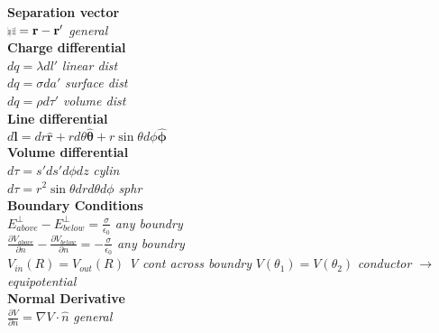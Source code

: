 \documentclass{article}
\def\brcurs{{\mbox{$\resizebox{.09in}{.08in}{\texttt{[image: BoldR]}}$}}}
\begin{document}
\pagebreak
\begin{multicols}{3}

\textbf{Separation vector} \\
$\brcurs = \mathbf{r} - \mathbf{r'}$ \textit{general} \\
\textbf{Charge differential} \\
$dq = \lambda dl'$ \textit{linear dist} \\
$dq = \sigma da'$ \textit{surface dist} \\
$dq = \rho d\tau'$ \textit{volume dist} \\
\textbf{Line differential} \\
$d\mathbf{l} = dr\hat{\mathbf{r}} + rd\theta \hat{\mathbf{\theta}} + r\sin{\theta}d\phi \hat{\mathbf{\phi}}$ \\
\textbf{Volume differential} \\
$d\tau = s'ds'd\phi dz$ \textit{cylin} \\
$d\tau = r^{2}\sin\theta dr d\theta d\phi $ \textit{sphr} \\
\textbf{Boundary Conditions} \\
$E^{\perp}_{above} - E^{\perp}_{below} = \frac{\sigma}{\epsilon_{0}}$ \textit{any boundry} \\
$\frac{\partial V_{above}}{\partial n} - \frac{\partial V_{below}}{\partial n} = -\frac{\sigma}{\epsilon_{0}}$ \textit{any boundry} \\
$V_{in}(R) = V_{out}(R)$ \textit{V cont across boundry}
$V(\theta_{1}) = V(\theta_{2})$ \textit{conductor $\rightarrow$  equipotential} \\
\textbf{Normal Derivative} \\
$\frac{\partial V}{\partial n} = \nabla V \cdot \hat{n}$ \textit{general} \\

\end{multicols}
\end{document}
